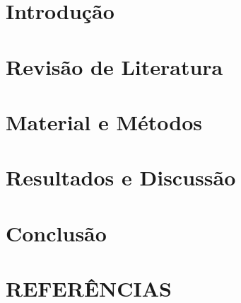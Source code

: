 \documentclass[
	12pt,				%
	openright,			%
	oneside,			%
	a4paper,			%
	brazil				%
	]{abntex2}
\begin{document}
\textual


\chapter{Introdução} 
\label{chap:introducao}


\chapter{Revisão de Literatura} 
\label{chap:revi}


\chapter{Material e Métodos} 
\label{chap:mati}


\chapter{Resultados e Discussão} 
\label{chap:resul}


\chapter{Conclusão} 
\label{chap:conc}




\chapter{REFERÊNCIAS}
\begin{NoTOC} 
\begingroup
\renewcommand{\chapter}[2]{}%

 


\end{NoTOC}
\endgroup

\postextual
\end{document}
